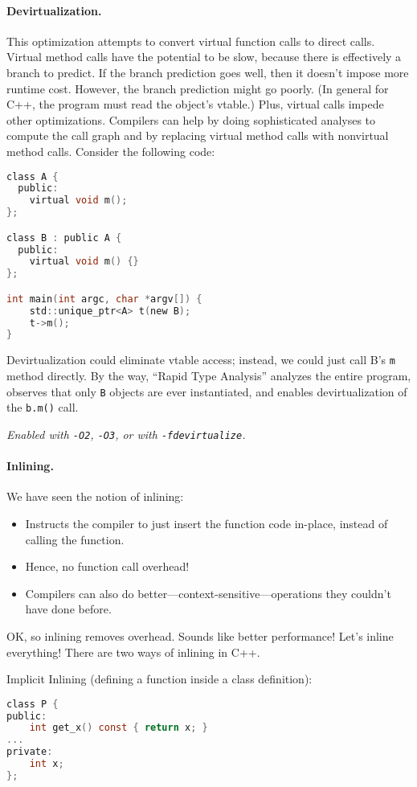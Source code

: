 \paragraph{Devirtualization.} This optimization attempts to convert
virtual function calls to direct calls.  Virtual method calls have the
potential to be slow, because there is effectively a branch to
predict. If the branch prediction goes well, then it doesn't impose
more runtime cost. However, the branch prediction might go poorly.  (In
general for C++, the program must read the object's vtable.) Plus, virtual
calls impede other optimizations. Compilers can help by doing
sophisticated analyses to compute the call graph and by replacing
virtual method calls with nonvirtual method calls.  Consider the
following code:
  \begin{lstlisting}[language=C]
class A {
  public:
    virtual void m();
};

class B : public A {
  public:
    virtual void m() {}
};

int main(int argc, char *argv[]) {
    std::unique_ptr<A> t(new B);
    t->m();
}
  \end{lstlisting}
Devirtualization could eliminate vtable access; instead, we could just call B's {\tt m} method
directly. By the way, ``Rapid Type Analysis'' analyzes the entire program, observes that
only {\tt B} objects are ever instantiated, and enables devirtualization
of the {\tt b.m()} call.

\noindent \emph{Enabled with {\tt -O2}, {\tt -O3}, or with {\tt -fdevirtualize}.}

\paragraph{Inlining.} We have seen the notion of inlining:
  \begin{itemize}
    \item Instructs the compiler to just insert the function code in-place,
      instead of calling the function.
    \item Hence, no function call overhead!
    \item Compilers can also do better---context-sensitive---operations they couldn't
      have done before.
  \end{itemize}

OK, so inlining removes overhead. Sounds like better performance! Let's inline everything!
There are two ways of inlining in C++.

Implicit Inlining (defining a function inside a class definition):
  \begin{lstlisting}[language=C]
class P {
public:
    int get_x() const { return x; }
...
private:
    int x;
};
  \end{lstlisting}

